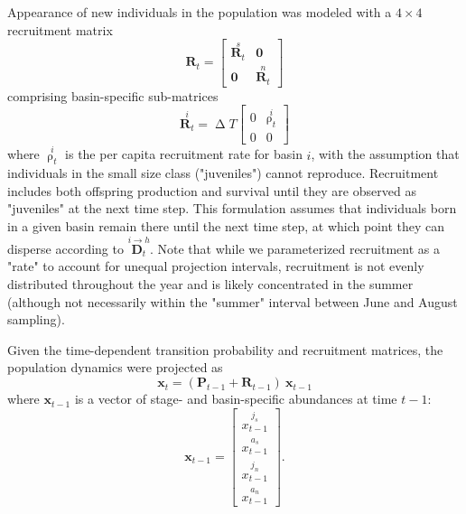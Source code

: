 Appearance of new individuals in the population was modeled with
a $4\times{4}$ recruitment matrix 
%
\begin{equation} \label{eq:Q}
\mathbf{R}_t = 
\left[
\begin{array}{c|ccc}
    \overset{s}{\mathbf{R}_t}  & \mathbf{0} \\
    \hline
    \mathbf{0} & \overset{n}{\mathbf{R}_t}
    \end{array}
\right]
\end{equation}
%
comprising basin-specific sub-matrices
%
\begin{equation} \label{eq:R}
\overset{i}{\mathbf{R}_t} = 
\upDelta T
\left[
\begin{array}{cccc}
    0 & \overset{i}{\uprho_t} \\
    0 & 0
    \end{array}
\right]
\end{equation}
%
where $\overset{i}{\uprho_t}$ is the per capita recruitment rate for basin $i$,
with the assumption that individuals in the small size class ("juveniles") cannot reproduce. 
Recruitment includes both offspring production and survival until 
they are observed as "juveniles" at the next time step. 
This formulation assumes that individuals born in a given basin remain there until the
next time step, at which point they can disperse according 
to $\overset{i\rightarrow h}{\mathbf{D}_t}$.
Note that while we parameterized recruitment as a "rate" to account for
unequal projection intervals, recruitment is not evenly distributed throughout the 
year and is likely concentrated in the summer 
(although not necessarily within the "summer" interval between June and August sampling).

Given the time-dependent transition probability and recruitment matrices, 
the population dynamics were projected as
%
\begin{equation} \label{eq:RPX}
    \mathbf{x}_t = (\mathbf{P}_{t-1} + \mathbf{R}_{t-1})~\mathbf{x}_{t-1}
\end{equation}
%
where $\mathbf{x}_{t-1}$ is a vector of stage- and basin-specific abundances at time $t-1$:
%
\begin{equation} \label{eq:X}
\mathbf{x}_{t-1} = 
\left[
\begin{array}{cccc}
    \overset{j_s}{x_{t-1}} \\
    \overset{a_s}{x_{t-1}} \\
    \overset{j_n}{x_{t-1}} \\
    \overset{a_n}{x_{t-1}}
    \end{array}
\right]
\text{.}
\end{equation}
%


